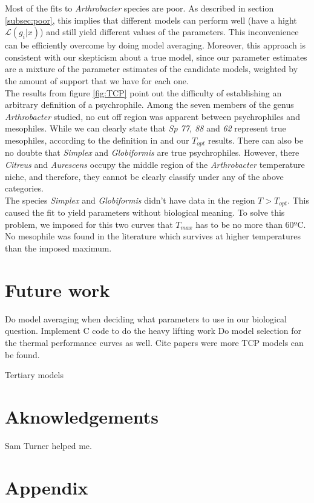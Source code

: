 \documentclass[titlepage,11pt]{article}
\begin{document}
\begin{linenumbers}
		Most of the fits to \textit{Arthrobacter} species are poor. As described in section \ref{subsec:poor}, this implies that different models can perform well (have a hight $ \mathcal{L}(g_i|x) $) and still yield different values of the parameters. This inconvenience can be efficiently overcome by doing model averaging. Moreover, this approach is consistent with our skepticism about a true model, since our parameter estimates are a mixture of the parameter estimates of the candidate models, weighted by the amount of support that we have for each one. \\
		The results from figure \ref{fig:TCP} point out the difficulty of establishing an arbitrary definition of a psychrophile. Among the seven members of the genus \textit{Arthrobacter} studied, no cut off region was apparent between  psychrophiles and mesophiles. While we can clearly state that \textit{Sp 77, 88} and \textit{62} represent true mesophiles, according to the definition in \cite{INGRAHAM1958} and our $ T_{opt} $ results. There can also be no doubte that \textit{Simplex} and \textit{Globiformis} are true psychrophiles. However, there \textit{Citreus} and \textit{Aurescens} occupy the middle region of the \textit{Arthrobacter} temperature niche, and therefore, they cannot be clearly classify under any of the above categories. \\
		The species \textit{Simplex} and \textit{Globiformis} didn't have data in the region $ T > T_{opt} $. This caused the fit to yield parameters without biological meaning. To solve this problem, we imposed for this two curves that $ T_{max} $ has to be no more than 60ºC. No mesophile was found in the literature \cite{Schiraldi2014} which survives at higher temperatures than the imposed maximum. \\
		\section{Future work}
		Do model averaging when deciding what parameters to use in our biological question. Implement C code to do the heavy lifting work
		Do model selection for the thermal performance curves as well. Cite papers were more TCP models can be found.
		
		Tertiary models
		\section{Aknowledgements}
		Sam Turner helped me.
		\newpage
		\section{Appendix}

\end{linenumbers}
\end{document}
